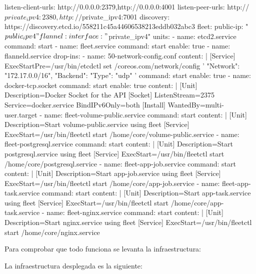 \begin{codelisting}
\begin{code}
    listen-client-urls: http://0.0.0.0:2379,http://0.0.0.0:4001
    listen-peer-urls: http://$private_ipv4:2380,http://$private_ipv4:7001
    discovery: https://discovery.etcd.io/558211c45a44606538213eddb032abc3
  fleet:
    public-ip: "$public_ipv4"
  flannel:
    interface: "$private_ipv4"
  units:
  - name: etcd2.service
    command: start
  - name: fleet.service
    command: start
    enable: true
  - name: flanneld.service
    drop-ins:
    - name: 50-network-config.conf
      content: |
        [Service]
        ExecStartPre=/usr/bin/etcdctl set /coreos.com/network/config 
                   '{ "Network": "172.17.0.0/16", "Backend": { "Type": "udp" } }'
    command: start
    enable: true
  - name: docker-tcp.socket
    command: start
    enable: true
    content: |
      [Unit]
      Description=Docker Socket for the API
      [Socket]
      ListenStream=2375
      Service=docker.service
      BindIPv6Only=both
      [Install]
      WantedBy=multi-user.target
  - name: fleet-volume-public.service
    command: start
    content: |
      [Unit]
      Description=Start volume-public.service using fleet
      [Service]
      ExecStart=/usr/bin/fleetctl start /home/core/volume-public.service
  - name: fleet-postgresql.service
    command: start
    content: |
      [Unit]
      Description=Start postgresql.service using fleet
      [Service]
      ExecStart=/usr/bin/fleetctl start /home/core/postgresql.service
  - name: fleet-app-job.service
    command: start
    content: |
      [Unit]
      Description=Start app-job.service using fleet
      [Service]
      ExecStart=/usr/bin/fleetctl start /home/core/app-job.service
  - name: fleet-app-task.service
    command: start
    content: |
      [Unit]
      Description=Start app-task.service using fleet
      [Service]
      ExecStart=/usr/bin/fleetctl start /home/core/app-task.service
  - name: fleet-nginx.service
    command: start
    content: |
      [Unit]
      Description=Start nginx.service using fleet
      [Service]
      ExecStart=/usr/bin/fleetctl start /home/core/nginx.service
\end{code}
\end{codelisting}

Para comprobar que todo funciona se levanta la infraestructura:


La infraestructura desplegada es la siguiente:

